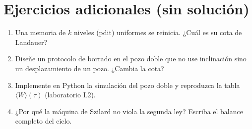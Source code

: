 \documentclass[11pt,a4paper]{article}
\begin{document}
\section{Ejercicios adicionales (sin solución)}
\begin{enumerate}[label=\textbf{P\arabic*.}]
\item Una memoria de $k$ niveles (pdit) uniformes se reinicia. ¿Cuál es su cota de Landauer?
\item Diseñe un protocolo de borrado en el pozo doble que no use inclinación sino un desplazamiento de un pozo. ¿Cambia la cota?
\item Implemente en Python la simulación del pozo doble y reproduzca la tabla $\langle W\rangle(\tau)$ (laboratorio L2).
\item ¿Por qué la máquina de Szilard no viola la segunda ley? Escriba el balance completo del ciclo.
\end{enumerate}
\end{document}

